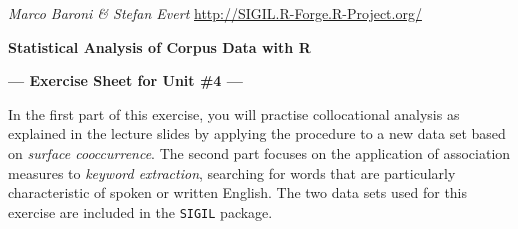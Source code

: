 \documentclass[a4paper,12pt]{article}
\begin{document}
\emph{Marco Baroni \& Stefan Evert} \hfill %
{\small \url{http://SIGIL.R-Forge.R-Project.org/}}

\begin{center}
  \textbf{\large Statistical Analysis of Corpus Data with R}

  \textbf{\large --- Exercise Sheet for Unit \#4 ---}
\end{center}

In the first part of this exercise, you will practise collocational analysis
as explained in the lecture slides by applying the procedure to a new data set
based on \emph{surface cooccurrence}.  The second part focuses on the
application of association measures to \emph{keyword extraction}, searching
for words that are particularly characteristic of spoken or written English.
The two data sets used for this exercise are included in the \texttt{SIGIL}
package.
\end{document}
